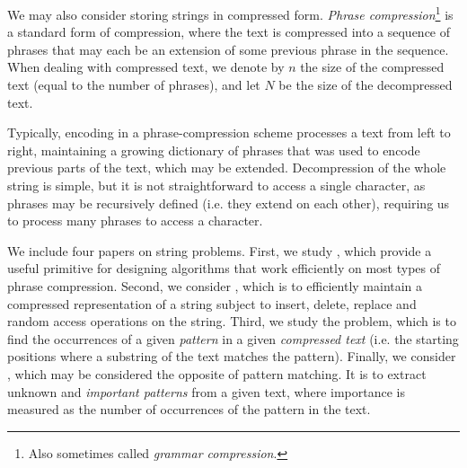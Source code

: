We may also consider storing strings in compressed form.
\emph{Phrase compression}\footnote{Also sometimes called \emph{grammar compression}.} is a standard form of compression, where the text is compressed into a sequence of phrases that may each be an extension of some previous phrase in the sequence. When dealing with compressed text, we denote by $n$ the size of the compressed text (equal to the number of phrases), and let $N$ be the size of the decompressed text. 

Typically, encoding in a phrase-compression scheme processes a text from left to right, maintaining a growing dictionary of phrases that was used to encode previous parts of the text, which may be extended. 
Decompression of the whole string is simple, but it is not straightforward to access a single character, as phrases may be recursively defined (i.e. they extend on each other), requiring us to process many phrases to access a character.


We include four papers on string problems. 
First, we study , which provide a useful primitive for designing algorithms that work efficiently on most types of phrase compression.
Second, we consider , which is to efficiently maintain a compressed representation of a string subject to insert, delete, replace and random access operations on the string.
Third, we study the  problem, which is to find the occurrences of a given \emph{pattern} in a given \emph{compressed text} (i.e. the starting positions where a substring of the text matches the pattern). 
Finally, we consider , which may be considered the opposite of pattern matching. It is to extract unknown and \emph{important patterns} from a given text, where importance is measured as the number of occurrences of the pattern in the text. 


